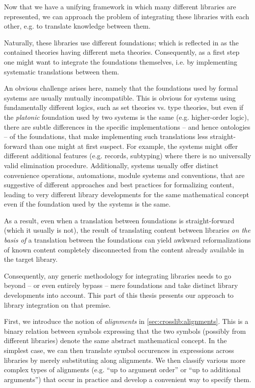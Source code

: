 Now that we have a unifying framework in which many different libraries are represented, we can approach the problem of integrating these libraries with each other, e.g. to translate knowledge between them. \medskip

Naturally, these libraries use different foundations; which is reflected in \mmt as the contained theories having different meta theories. Consequently, as a first step one might want to integrate the foundations themselves, i.e. by implementing systematic translations between them. 

An obvious challenge arises here, namely that the foundations used by formal systems are usually mutually incompatible. This is obvious for systems using fundamentally different logics, such as set theories vs. type theories, but even if the \emph{platonic} foundation used by two systems is the same (e.g. higher-order logic), there are subtle differences in the specific implementations -- and hence ontologies -- of the foundations, that make implementing such translations less straight-forward than one might at first suspect. For example, the systems might offer different additional features (e.g. records, subtyping) where there is no universally valid elimination procedure. Additionally, systems usually offer distinct convenience operations, automations, module systems and conventions, that are suggestive of different approaches and best practices for formalizing content, leading to very different library developments for the same mathematical concept even if the foundation used by the systems is the same.

As a result, even when a translation between foundations is straight-forward (which it usually is not), the result of translating content between libraries \emph{on the basis of} a translation between the foundations can yield awkward reformalizations of known content completely disconnected from the content already available in the target library.

Consequently, any generic methodology for integrating libraries needs to go beyond -- or even entirely bypass -- mere foundations and take distinct library developments into account. This part of this thesis presents our approach to library integration on that premise.\medskip

First, we introduce the notion of \emph{alignments} in \autoref{sec:crosslib:alignments}. This is a binary relation between symbols expressing that the two symbols (possibly from different libraries) denote the same abstract mathematical concept. In the simplest case, we can then translate symbol occurences in expressions across libraries by merely substituting along alignments. We then classify various more complex types of alignments (e.g. ``up to argument order'' or ``up to additional arguments'') that occur in practice and develop a convenient way to specify them.

